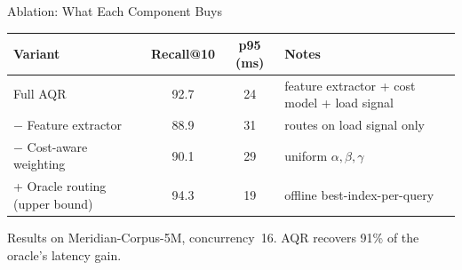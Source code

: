 \begin{frame}{Ablation: What Each Component Buys}
\small
\renewcommand{\arraystretch}{1.25}
\begin{center}
\begin{tabular}{lccp{3.4cm}}
\toprule
\textbf{Variant} & \textbf{Recall@10} & \textbf{p95 (ms)} & \textbf{Notes} \\
\midrule
Full AQR & 92.7 & 24 & feature extractor + cost model + load signal \\
$-$ Feature extractor & 88.9 & 31 & routes on load signal only \\
$-$ Cost-aware weighting & 90.1 & 29 & uniform $\alpha,\beta,\gamma$ \\
\rowcolor{thesisgold!15}
+ Oracle routing (upper bound) & 94.3 & 19 & offline best-index-per-query \\
\bottomrule
\end{tabular}
\end{center}
\vspace{0.2cm}
\footnotesize Results on Meridian-Corpus-5M, concurrency~16. AQR recovers 91\% of the oracle's latency gain.
\end{frame}
